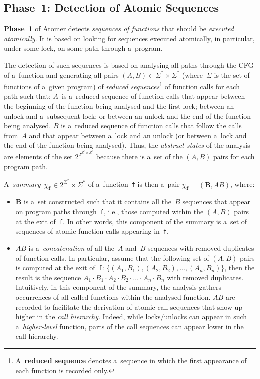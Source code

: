 \documentclass{ExcelAtFIT}
\theoremstyle{example}
\begin{document}
\subsection{Phase~1: Detection of Atomic Sequences}

\textbf{Phase~1} of Atomer detects \emph{sequences of functions} that should be \emph{executed atomically}. It is based on looking for sequences executed atomically, in particular, under some lock, on some path through a~program.

The detection of such sequences is based on analysing all paths through the CFG of a~function and generating all pairs $ {(A, B)} \in {\Sigma^* \times \Sigma^*} $ (where~$ \Sigma $ is the set of functions of a~given program) of \emph{reduced sequences}\footnote{A~\textbf{reduced sequence} denotes a~sequence in which the first appearance of each function is recorded only.} of function calls for each path such that: $ A $~is a~reduced sequence of function calls that appear between the beginning of the function being analysed and the first lock; between an unlock and a~subsequent lock; or between an unlock and the end of the function being analysed. $ B $ is a~reduced sequence of function calls that follow the calls from~$ A $ and that appear between a~lock and an unlock (or between a~lock and the end of the function being analysed). Thus, the \emph{abstract states} of the analysis are elements of the set $ 2^{2^{\Sigma^* \times \Sigma^*}} $ because there is a~set of the ${ (A, B) }$ pairs for each program path.

A~\emph{summary}~$ \chi_\mathtt{f} \in 2^{\Sigma^*} \times \Sigma^* $ of a~function~\texttt{f} is then a~pair $ \chi_\mathtt{f} = (\boldsymbol{B}, AB) $, where:
\begin{itemize}
    \item $ \boldsymbol{B} $ is a~set constructed such that it contains all the~$ B $ sequences that appear on program paths through~\texttt{f}, i.e., those computed within the ${ (A, B) }$ pairs at the exit of~\texttt{f}. In other words, this component of the summary is a~set of sequences of atomic function calls appearing in~\texttt{f}.

    \item $ AB $ is a~\emph{concatenation} of all the~$ A $ and~$ B $ sequences with removed duplicates of function calls. In particular, assume that the following set of ${ (A, B) }$ pairs is computed at the exit of~\texttt{f}: $ \{{(A_1, B_1)}, {(A_2, B_2)}, \ldots, {(A_n, B_n)}\} $, then the result is the sequence $ A_1 \cdot B_1 \cdot A_2 \cdot B_2 \cdot \ldots \cdot A_n \cdot B_n $ with removed duplicates. Intuitively, in this component of the summary, the analysis gathers occurrences of all called functions within the analysed function. $ AB $ are recorded to facilitate the derivation of atomic call sequences that show up higher in the \emph{call hierarchy}. Indeed, while locks/unlocks can appear in such a~\emph{higher-level} function, parts of the call sequences can appear lower in the call hierarchy.
\end{itemize}
\end{document}
